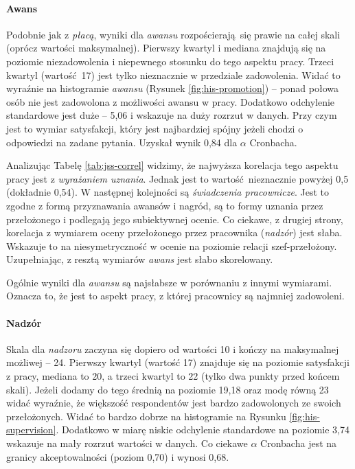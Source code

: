 \paragraph{Awans} Podobnie jak z \textit{płacą}, wyniki dla \emph{awansu} rozpościerają się prawie na całej skali (oprócz wartości maksymalnej). Pierwszy kwartyl i mediana znajdują się na poziomie niezadowolenia i niepewnego stosunku do tego aspektu pracy. Trzeci kwartyl (wartość 17) jest tylko nieznacznie w przedziale zadowolenia. Widać to wyraźnie na histogramie \emph{awansu} (Rysunek \ref{fig:his-promotion}) -- ponad połowa osób nie jest zadowolona
z możliwości awansu w pracy. Dodatkowo odchylenie standardowe jest duże -- 5,06 i wskazuje na duży rozrzut w danych. Przy czym jest to wymiar satysfakcji, który jest najbardziej spójny jeżeli chodzi o odpowiedzi na zadane pytania. Uzyskał wynik 0,84 dla $\alpha$ Cronbacha.

Analizując Tabelę \ref{tab:jss-correl} widzimy, że najwyższa korelacja tego aspektu pracy jest z \textit{wyrażaniem uznania}. Jednak jest to wartość nieznacznie powyżej 0,5 (dokładnie 0,54). W następnej kolejności są \emph{świadczenia pracownicze}. Jest to zgodne z formą przyznawania awansów i nagród, są to formy uznania przez przełożonego i podlegają jego subiektywnej ocenie. Co ciekawe, z drugiej strony, korelacja z wymiarem oceny przełożonego  przez pracownika (\emph{nadzór}) jest słaba. Wskazuje to na niesymetryczność w
ocenie na poziomie relacji szef-przełożony. Uzupełniając, z resztą wymiarów \textit{awans} jest słabo skorelowany. 

Ogólnie wyniki dla \textit{awansu} są najsłabsze w porównaniu z innymi wymiarami. Oznacza to, że jest to aspekt pracy, z której pracownicy są najmniej zadowoleni.

\paragraph{Nadzór} Skala dla \textit{nadzoru} zaczyna się dopiero od wartości 10 i kończy na maksymalnej możliwej -- 24. Pierwszy kwartyl (wartość 17) znajduje się na poziomie satysfakcji z pracy, mediana to 20, a trzeci kwartyl to 22 (tylko dwa punkty przed końcem skali). Jeżeli dodamy do tego średnią na poziomie 19,18 oraz modę równą 23 widać wyraźnie, że większość respondentów jest bardzo zadowolonych ze swoich przełożonych. Widać to bardzo dobrze na histogramie na Rysunku
\ref{fig:his-supervision}. Dodatkowo w miarę niskie odchylenie standardowe
na poziomie 3,74 wskazuje na mały rozrzut wartości w danych. Co ciekawe $\alpha$ Cronbacha jest na granicy akceptowalności (poziom 0,70) i wynosi 0,68.


